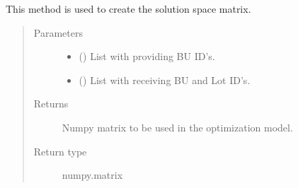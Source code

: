 \documentclass[letterpaper,10pt,english]{sphinxmanual}
\begin{document}
\begin{fulllineitems}

\begin{fulllineitems}
\label{\detokenize{source/optimization:optimization.solspace.SolutionSpace.RECEIVING_GROUPBY}}
\end{fulllineitems}


\begin{fulllineitems}
\label{\detokenize{source/optimization:optimization.solspace.SolutionSpace._create_matrix}}
This method is used to create the solution space matrix.
\begin{quote}\begin{description}
\item[{Parameters}] \leavevmode\begin{itemize}
\item {} 
 () \textendash{} List with providing BU ID’s.

\item {} 
 () \textendash{} List with receiving BU and Lot ID’s.

\end{itemize}

\item[{Returns}] \leavevmode
{} \textendash{} Numpy matrix to be used in the optimization model.

\item[{Return type}] \leavevmode
numpy.matrix

\end{description}\end{quote}

\end{fulllineitems}


\end{fulllineitems}
\end{document}
